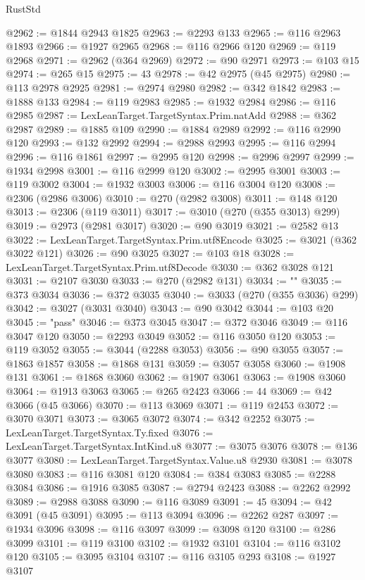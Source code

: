 \begin{lexlean}{RustStd}
\begin{coremodule}
@2962 := @1844 @2943 @1825
@2963 := @2293 @133
@2965 := @116 @2963 @1893
@2966 := @1927 @2965
@2968 := @116 @2966 @120
@2969 := @119 @2968
@2971 := @2962 (@364 @2969)
@2972 := @90 @2971
@2973 := @103 @15
@2974 := @265 @15
@2975 := 43
@2978 := @42 @2975 (@45 @2975)
@2980 := @113 @2978 @2925
@2981 := @2974 @2980
@2982 := @342 @1842
@2983 := @1888 @133
@2984 := @119 @2983
@2985 := @1932 @2984
@2986 := @116 @2985
@2987 := LexLeanTarget.TargetSyntax.Prim.natAdd
@2988 := @362 @2987
@2989 := @1885 @109
@2990 := @1884 @2989
@2992 := @116 @2990 @120
@2993 := @132 @2992
@2994 := @2988 @2993
@2995 := @116 @2994
@2996 := @116 @1861
@2997 := @2995 @120
@2998 := @2996 @2997
@2999 := @1934 @2998
@3001 := @116 @2999 @120
@3002 := @2995 @3001
@3003 := @119 @3002
@3004 := @1932 @3003
@3006 := @116 @3004 @120
@3008 := @2306 (@2986 @3006)
@3010 := @270 (@2982 @3008)
@3011 := @148 @120
@3013 := @2306 (@119 @3011)
@3017 := @3010 (@270 (@355 @3013) @299)
@3019 := @2973 (@2981 @3017)
@3020 := @90 @3019
@3021 := @2582 @13
@3022 := LexLeanTarget.TargetSyntax.Prim.utf8Encode
@3025 := @3021 (@362 @3022 @121)
@3026 := @90 @3025
@3027 := @103 @18
@3028 := LexLeanTarget.TargetSyntax.Prim.utf8Decode
@3030 := @362 @3028 @121
@3031 := @2107 @3030
@3033 := @270 (@2982 @131)
@3034 := ""
@3035 := @373 @3034
@3036 := @372 @3035
@3040 := @3033 (@270 (@355 @3036) @299)
@3042 := @3027 (@3031 @3040)
@3043 := @90 @3042
@3044 := @103 @20
@3045 := "pass"
@3046 := @373 @3045
@3047 := @372 @3046
@3049 := @116 @3047 @120
@3050 := @2293 @3049
@3052 := @116 @3050 @120
@3053 := @119 @3052
@3055 := @3044 (@2288 @3053)
@3056 := @90 @3055
@3057 := @1863 @1857
@3058 := @1868 @131
@3059 := @3057 @3058
@3060 := @1908 @131
@3061 := @1868 @3060
@3062 := @1907 @3061
@3063 := @1908 @3060
@3064 := @1913 @3063
@3065 := @265 @2423
@3066 := 44
@3069 := @42 @3066 (@45 @3066)
@3070 := @113 @3069
@3071 := @119 @2453
@3072 := @3070 @3071
@3073 := @3065 @3072
@3074 := @342 @2252
@3075 := LexLeanTarget.TargetSyntax.Ty.fixed
@3076 := LexLeanTarget.TargetSyntax.IntKind.u8
@3077 := @3075 @3076
@3078 := @136 @3077
@3080 := LexLeanTarget.TargetSyntax.Value.u8 @2930
@3081 := @3078 @3080
@3083 := @116 @3081 @120
@3084 := @384 @3083
@3085 := @2288 @3084
@3086 := @1916 @3085
@3087 := @2794 @2423
@3088 := @2262 @2992
@3089 := @2988 @3088
@3090 := @116 @3089
@3091 := 45
@3094 := @42 @3091 (@45 @3091)
@3095 := @113 @3094
@3096 := @2262 @287
@3097 := @1934 @3096
@3098 := @116 @3097
@3099 := @3098 @120
@3100 := @286 @3099
@3101 := @119 @3100
@3102 := @1932 @3101
@3104 := @116 @3102 @120
@3105 := @3095 @3104
@3107 := @116 @3105 @293
@3108 := @1927 @3107

\end{coremodule}
\end{lexlean}
